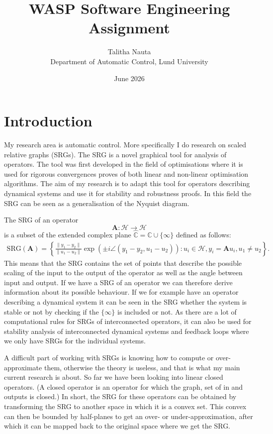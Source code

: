 \documentclass[a4paper, 11pt]{article}
\title{WASP Software Engineering Assignment}
\author{Talitha Nauta \\ Department of Automatic Control, Lund University}
\date{June 2026}
\newcommand{\hilbert}{\mathcal{H}}
\newcommand{\Compex}{\ensuremath{\hat{\mathbb{C}}}}
\newcommand{\srg}[1]{\ensuremath{\mathrm{SRG}\left(#1\right)}} %
\newcommand{\y}{y}  %
\renewcommand{\u}{u}  %
\begin{document}
\maketitle

\section{Introduction}
My research area is automatic control. More specifically I do research on scaled relative graphs (SRGs). The SRG is a novel graphical tool for analysis of operators. The tool was first developed in the field of optimisations where it is used for rigorous convergences proves of both linear and non-linear optimisation algorithms. The aim of my research is to adapt this tool for operators describing dynamical systems and use it for stability and robustness proofs. In this field the SRG can be seen as a generalisation of the Nyquist diagram.

The SRG of an operator    
\begin{equation}
        \mathbf{A} : \hilbert \rightarrow \hilbert
\end{equation}
is a subset of the extended complex plane $\Compex = \mathbb{C} \cup \{\infty\}$ defined as follows:
\begin{align}
     \srg{\mathbf{A}} = \left\{ \frac{\| \y_1 - \y_2 \|}{\| \u_1 - \u_2\|}  \exp \left( \pm i \angle(\y_1-\y_2,\u_1-\u_2) \right) :
    \u_i \in \hilbert,  \y_i = \mathbf{A} \u_i,  \u_1 \neq \u_2  \right\}.
\end{align}
This means that the SRG contains the set of points that describe the possible scaling of the input to the output of the operator as well as the angle between input and output. If we have a SRG of an operator we can therefore derive information about its possible behaviour. If we for example have an operator describing a dynamical system it can be seen in the SRG whether the system is stable or not by checking if the $\{\infty\}$ is included or not. As there are a lot of computational rules for SRGs of interconnected operators, it can also be used for stability analysis of interconnected dynamical systems and feedback loops where we only have SRGs for the individual systems. 

A difficult part of working with SRGs is knowing how to compute or over-approximate them, otherwise the theory is useless, and that is what my main current research is about. So far we have been looking into linear closed operators. (A closed operator is an operator for which the graph, set of in and outputs is closed.) In short, the SRG for these operators can be obtained by transforming the SRG to another space in which it is a convex set. This convex can then be bounded by half-planes to get an over- or under-approximation, after which it can be mapped back to the original space where we get the SRG. 
\end{document}
